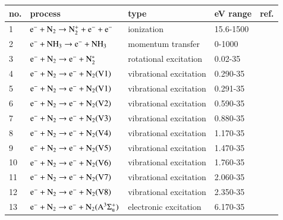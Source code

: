 \begin{table}
  \center{}
  \begin{threeparttable}
    \label{tab:tableN2}
    \begin{tabular*}{\textwidth}{l@{\extracolsep{\fill}}llll}
    \toprule
    {no.}  & {process} & {type} &  {eV range}  &  {ref.} \\
    \midrule
      1 & $\rm e^- + N_2 \rightarrow N_2^+ + e^- + e^-$  &  ionization    &  15.6-1500 &   \cite{lxc:2024:morgan} \\ 
      \midrule     
      2 & $\rm e^- + NH_3 \rightarrow e^- + NH_3$  &  momentum transfer   &  0-1000  & \cite{lxc:2024:morgan}\\   
      \midrule
      3 & $\rm e^- + N_2 \rightarrow e^- + N_2^* $  &  rotational excitation   &  0.02-35 & \cite{lxc:2024:morgan}\\ 
           \midrule
      4 & $\rm e^- + N_2 \rightarrow e^- + N_2(V1)$  &  vibrational excitation   &  0.290-35 &\cite{lxc:2024:morgan}\\  
      5 & $\rm e^- + N_2 \rightarrow e^- + N_2(V1)$  &  vibrational excitation   &  0.291-35 &\cite{lxc:2024:morgan}\\  
      6 & $\rm e^- + N_2 \rightarrow e^- + N_2(V2)$  &  vibrational excitation   &  0.590-35 &\cite{lxc:2024:morgan}\\ 
      7 & $\rm e^- + N_2 \rightarrow e^- + N_2(V3)$  &  vibrational excitation   &  0.880-35 &\cite{lxc:2024:morgan}\\ 
      8 & $\rm e^- + N_2 \rightarrow e^- + N_2(V4)$  &  vibrational excitation   &  1.170-35 &\cite{lxc:2024:morgan}\\ 
      9 & $\rm e^- + N_2 \rightarrow e^- + N_2(V5)$  &  vibrational excitation   &  1.470-35 &\cite{lxc:2024:morgan}\\
      10 & $\rm e^- + N_2 \rightarrow e^- + N_2(V6)$  &  vibrational excitation   &  1.760-35 &\cite{lxc:2024:morgan}\\ 
      11 & $\rm e^- + N_2 \rightarrow e^- + N_2(V7)$  &  vibrational excitation   &  2.060-35 &\cite{lxc:2024:morgan}\\ 
      12 & $\rm e^- + N_2 \rightarrow e^- + N_2(V8)$  &  vibrational excitation   &  2.350-35 &\cite{lxc:2024:morgan}\\ 
          \midrule
      13 & $\rm e^- + N_2 \rightarrow e^- + N_2(A^3 \Sigma_{u}^+) $  &  electronic excitation   &  6.170-35 & \cite{lxc:2024:morgan}\\ 

\end{tabular*}
\end{threeparttable}
\end{table}
